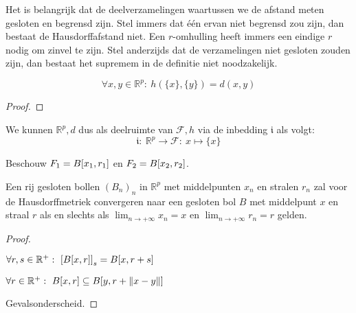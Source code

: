 \documentclass[main.tex]{subfiles}
\begin{document}
\begin{opm}
  Het is belangrijk dat de deelverzamelingen waartussen we de afstand meten gesloten en begrensd zijn.
  Stel immers dat \'e\'en ervan niet begrensd zou zijn, dan bestaat de Hausdorffafstand niet.
  Een $r$-omhulling heeft immers een eindige $r$ nodig om zinvel te zijn.
  Stel anderzijds dat de verzamelingen niet gesloten zouden zijn, dan bestaat het supremem in de definitie niet noodzakelijk.
\end{opm}

\begin{st}
  \[ \forall x,y \in \mathbb{R}^{p}:\ h(\{x\},\{y\}) = d(x,y) \]

  \begin{proof}
    
  \end{proof}
\end{st}
\begin{opm}
  We kunnen $\mathbb{R}^{p},d$ dus als deelruimte van $\mathcal{F},h$ via de inbedding $\mathfrak{i}$ als volgt:
  \[ \mathfrak{i}:\ \mathbb{R}^{p} \rightarrow \mathcal{F}:\ x \mapsto \{x\} \]
\end{opm}

\begin{vb}
  Beschouw $F_{1} = B\interval{x_{1}}{r_{1}}$ en $F_{2}= B\interval{x_{2}}{r_{2}}$.

\end{vb}


\begin{st}
  Een rij gesloten bollen $(B_{n})_{n}$ in $\mathbb{R}^{p}$ met middelpunten $x_{n}$ en stralen $r_{n}$ zal voor de Hausdorffmetriek convergeren naar een gesloten bol $B$ met middelpunt $x$ en straal $r$ als en slechts als $\lim_{n\rightarrow +\infty}x_{n}=x$ en $\lim_{n\rightarrow +\infty}r_{n} = r$ gelden.
\begin{klad}
\begin{proof}
  \begin{lem}
    $\forall r,s \in \mathbb{R}^{+}:\ \left[B\interval{x}{r}\right]_{s} = B\interval{x}{r+s}$
  \end{lem}

  \begin{lem}
    $\forall r\in \mathbb{R}^{+}:\ B\interval{x}{r} \subseteq B\interval{y}{r+\|x-y\|}$
  \end{lem}
  Gevalsonderscheid.
\end{proof}
\end{klad}
\end{st}
\end{document}
